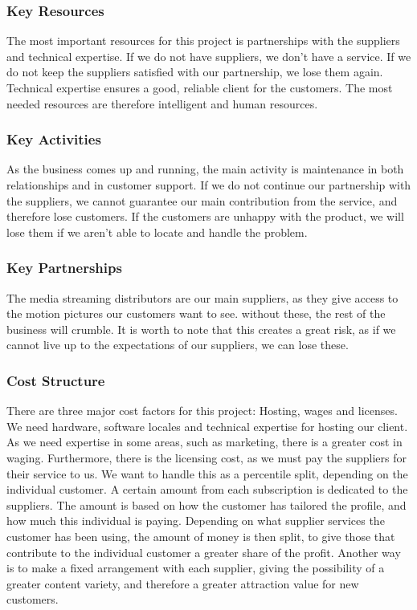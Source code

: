 \subsubsection*{Key Resources}
The most important resources for this project is partnerships with the suppliers and technical expertise. If we do not have suppliers, we don't have a service. If we do not keep the suppliers satisfied with our partnership, we lose them again. Technical expertise ensures a good, reliable client for the customers. The most needed resources are therefore intelligent and human resources.

\subsubsection*{Key Activities}
As the business comes up and running, the main activity is maintenance in both relationships and in customer support. If we do not continue our partnership with the suppliers, we cannot guarantee our main contribution from the service, and therefore lose customers. If the customers are unhappy with the product, we will lose them if we aren't able to locate and handle the problem.

\subsubsection*{Key Partnerships}
The media streaming distributors are our main suppliers, as they give access to the motion pictures our customers want to see. without these, the rest of the business will crumble. It is worth to note that this creates a great risk, as if we cannot live up to the expectations of our suppliers, we can lose these.

\subsubsection*{Cost Structure}
There are three major cost factors for this project: Hosting, wages and licenses. We need hardware, software locales and technical expertise for hosting our client. As we need expertise in some areas, such as marketing, there is a greater cost in waging. Furthermore, there is the licensing cost, as we must pay the suppliers for their service to us. We want to handle this as a percentile split, depending on the individual customer. A certain amount from each subscription is dedicated to the suppliers. The amount is based on how the customer has tailored the profile, and how much this individual is paying. Depending on what supplier services the customer has been using, the amount of money is then split, to give those that contribute to the individual customer a greater share of the profit. Another way is to make a fixed arrangement with each supplier, giving the possibility of a greater content variety, and therefore a greater attraction value for new customers.


